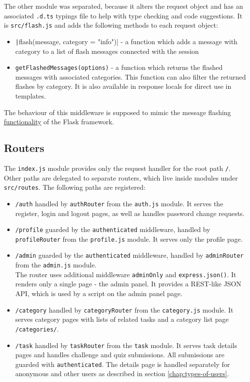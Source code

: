 The other module was separated, because it alters the request object and has an associated \texttt{.d.ts} typings file to help with type checking and code suggestions. It is \texttt{src/flash.js} and adds the following methods to each request object:

\begin{itemize}
    \item \texttt|flash(message, category = "info")| - a function which adds a message with category to a list of flash messages connected with the session
    \item \texttt{getFlashedMessages(options)} - a function which returns the flashed messages with associated categories. This function can also filter the returned flashes by category. It is also available in response locals for direct use in templates.
\end{itemize}

The behaviour of this middleware is supposed to mimic the message flashing \href{https://flask.palletsprojects.com/en/2.2.x/quickstart/#message-flashing}{functionality} of the Flask framework.

\subsection{Routers}

The \texttt{index.js} module provides only the request handler for the root path \texttt{/}. Other paths are delegated to separate routers, which live inside modules under \texttt{src/routes}. The following paths are registered:

\begin{itemize}
    \item \texttt{/auth} handled by \texttt{authRouter} from the \texttt{auth.js} module. It serves the register, login and logout pages, as well as handles password change requests.
    \item \texttt{/profile} guarded by the \texttt{authenticated} middleware, handled by \texttt{profileRouter} from the \texttt{profile.js} module. It serves only the profile page.
    \item \texttt{/admin} guarded by the \texttt{authenticated} middleware, handled by \texttt{adminRouter} from the \texttt{admin.js} module.\\
    The router uses additional middleware \texttt{adminOnly} and \texttt{express.json()}. It renders only a single page - the admin panel. It provides a REST-like JSON API, which is used by a script on the admin panel page.
    \item \texttt{/category} handled by \texttt{categoryRouter} from the \texttt{category.js} module. It serves category pages with lists of related tasks and a category list page \texttt{/categories/}.
    \item \texttt{/task} handled by \texttt{taskRouter} from the \texttt{task} module. It serves task details pages and handles challenge and quiz submissions. All submissions are guarded with \texttt{authenticated}. The details page is handled separately for anonymous and other users as described in section \ref{chap:types-of-users}.
\end{itemize}

